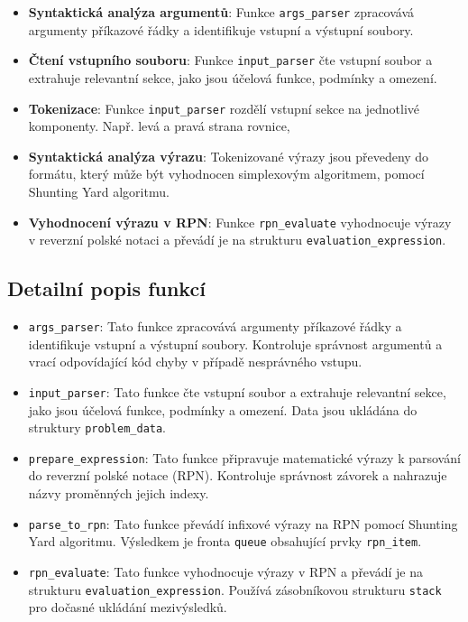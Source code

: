 \documentclass[czech, sem, kiv, he, pdf, viewonly]{fasthesis}
\begin{document}
\begin{itemize}
    \item \textbf{Syntaktická analýza argumentů}: Funkce \texttt{args\_parser} zpracovává argumenty příkazové řádky a identifikuje vstupní a výstupní soubory.
    \item \textbf{Čtení vstupního souboru}: Funkce \texttt{input\_parser} čte vstupní soubor a extrahuje relevantní sekce, jako jsou účelová funkce, podmínky a omezení.
    \item \textbf{Tokenizace}: Funkce \texttt{input\_parser} rozdělí vstupní sekce na jednotlivé komponenty. Např. levá a pravá strana rovnice, 
    \item \textbf{Syntaktická analýza výrazu}: Tokenizované výrazy jsou převedeny do formátu, který může být vyhodnocen simplexovým algoritmem, pomocí Shunting Yard algoritmu.
    \item \textbf{Vyhodnocení výrazu v RPN}: Funkce \texttt{rpn\_evaluate} vyhodnocuje výrazy v reverzní polské notaci a převádí je na strukturu \texttt{evaluation\_expression}.
\end{itemize}

\subsection{Detailní popis funkcí}

\begin{itemize}
    \item \texttt{args\_parser}: Tato funkce zpracovává argumenty příkazové řádky a identifikuje vstupní a výstupní soubory. Kontroluje správnost argumentů a vrací odpovídající kód chyby v případě nesprávného vstupu.
    \item \texttt{input\_parser}: Tato funkce čte vstupní soubor a extrahuje relevantní sekce, jako jsou účelová funkce, podmínky a omezení. Data jsou ukládána do struktury \texttt{problem\_data}.
    \item \texttt{prepare\_expression}: Tato funkce připravuje matematické výrazy k parsování do reverzní polské notace (RPN). Kontroluje správnost závorek a nahrazuje názvy proměnných jejich indexy.
    \item \texttt{parse\_to\_rpn}: Tato funkce převádí infixové výrazy na RPN pomocí Shunting Yard algoritmu. Výsledkem je fronta \texttt{queue} obsahující prvky \texttt{rpn\_item}.
    \item \texttt{rpn\_evaluate}: Tato funkce vyhodnocuje výrazy v RPN a převádí je na strukturu \texttt{evaluation\_expression}. Používá zásobníkovou strukturu \texttt{stack} pro dočasné ukládání mezivýsledků.
\end{itemize}
\end{document}
